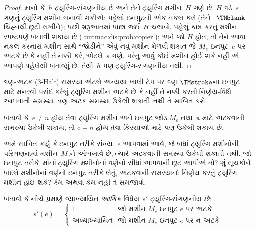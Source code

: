 \begin{proof}
માનો કે~$h$ ટ્યુરિંગ-સંગણનીય છે અને તેને ટ્યુરિંગ
મશીન~$H$ ગણે છે. $H$ વડે~$s$ ગણતું ટ્યુરિંગ મશીન
બનાવી શકીએ: પહેલાં ઇનપુટની એક નકલ કરો (તેને
~$\TMblank$ ચિહ્નથી છૂટી રાખીને); પછી શરૂઆતમાં
પાછા જઈ~$H$ ચલાવો. પહેલું કામ કરતું મશીન સ્પષ્ટપણે
બનાવી શકાય છે (\cref{tur:mac:dis:prob:copier});
અને જો $H$ હોત, તો તેને આવા નકલ કરનારા મશીન સાથે
``જોડીને'' એવું નવું મશીન મેળવી શકાત જે~$M_e$
ઇનપુટ~$e$ પર અટકે છે કે નહીં તે નક્કી કરે, એટલે~$s$
ગણે. પરંતુ આવું કોઈ મશીન હોઈ શકે નહીં એ આપણે પહેલેથી
બતાવ્યું છે. તેથી~$h$ પણ ટ્યુરિંગ-સંગણનીય નથી.
\end{proof}

\begin{prob}
ત્રણ-અટક (3-Halt) સમસ્યા એટલે અન્યથા ખાલી ટેપ પર
ત્રણ $\TMstroke$ના ઇનપુટ માટે મનસ્વી પસંદ કરેલું
ટ્યુરિંગ મશીન અટકે છે કે નહીં તે નક્કી કરતી નિર્ણય-વિધિ
આપવાની સમસ્યા. ત્રણ-અટક સમસ્યા ઉકેલી શકાતી નથી
તે સાબિત કરો.
\end{prob}

\begin{prob}
બતાવો કે~$e \neq n$ હોય તેવા ટ્યુરિંગ મશીન અને ઇનપુટ
જોડ $M_e$ તથા~$n$ માટે અટકવાની સમસ્યા ઉકેલી શકાય,
તો $e = n$ હોય તેવા કિસ્સાઓ માટે પણ ઉકેલી શકાય છે.
\end{prob}

\begin{prob}
અમે સાબિત કર્યું કે ઇનપુટ તરીકે સંખ્યા~$e$ આપવામાં આવે,
જે બધાં ટ્યુરિંગ મશીનોની પરિગણનામાં મશીન~$M_e$ને
ઓળખાવે છે, ત્યારે અટકવાની સમસ્યા ઉકેલી શકાતી નથી.
જો ઇનપુટ તરીકે~માંનાં
ટ્યુરિંગ મશીનોનાં વર્ણનો સીધાં આપવાની છૂટ આપીએ તો?
શું સૂચકોને બદલે મશીનોનાં વર્ણનો ઇનપુટ તરીકે લેતું,
અટકવાની સમસ્યાનો નિર્ણય કરતું ટ્યુરિંગ મશીન હોઈ
શકે? કેમ અથવા કેમ નહીં તે સમજાવો.
\end{prob}

\begin{prob} બતાવો કે નીચે પ્રમાણે વ્યાખ્યાયિત
  \emph{આંશિક} વિધેય~$s'$ ટ્યુરિંગ-સંગણનીય \emph{છે}:
  \[
  s'(e) =
  \begin{cases}
    \text{1} & \text{જો મશીન~$M_e$ ઇનપુટ $e$ પર અટકે}\\
    \text{અવ્યાખ્યાયિત} & \text{જો મશીન~$M_e$ ઇનપુટ $e$ પર ન અટકે}
  \end{cases}
  \]
\end{prob}
\endgroup


\begingroup
\makeatletter{}\makeatother

\label{guunit:OLP-0269}



